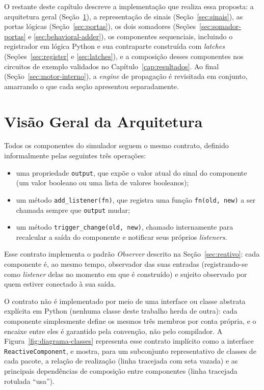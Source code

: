 O restante deste capítulo descreve a implementação que realiza essa proposta: a arquitetura geral (Seção~\ref{sec:visao-arquitetura}), a representação de sinais (Seção~\ref{sec:sinais}), as portas lógicas (Seção~\ref{sec:portas}), os dois somadores (Seções~\ref{sec:somador-portas} e \ref{sec:behavioral-adder}), os componentes sequenciais, incluindo o registrador em lógica Python e sua contraparte construída com \textit{latches} (Seções~\ref{sec:register} e \ref{sec:latches}), e a composição desses componentes nos circuitos de exemplo validados no Capítulo~\ref{cap:resultados}. Ao final (Seção~\ref{sec:motor-interno}), a \textit{engine} de propagação é revisitada em conjunto, amarrando o que cada seção apresentou separadamente.

\section{Visão Geral da Arquitetura}
\label{sec:visao-arquitetura}

Todos os componentes do simulador seguem o mesmo contrato, definido informalmente pelas seguintes três operações:

\begin{itemize}
    \item uma propriedade \texttt{output}, que expõe o valor atual do sinal do componente (um valor booleano ou uma lista de valores booleanos);
    \item um método \texttt{add\_listener(fn)}, que registra uma função \texttt{fn(old, new)} a ser chamada sempre que \texttt{output} mudar;
    \item um método \texttt{trigger\_change(old, new)}, chamado internamente para recalcular a saída do componente e notificar seus próprios \textit{listeners}.
\end{itemize}

Esse contrato implementa o padrão \textit{Observer} descrito na Seção~\ref{sec:reativo}: cada componente é, ao mesmo tempo, observador das suas entradas (registrando-se como \textit{listener} delas no momento em que é construído) e sujeito observado por quem estiver conectado à sua saída.

O contrato não é implementado por meio de uma interface ou classe abstrata explícita em Python (nenhuma classe deste trabalho herda de outra): cada componente simplesmente define os mesmos três membros por conta própria, e o encaixe entre eles é garantido pela convenção, não pelo compilador. A Figura~\ref{fig:diagrama-classes} representa esse contrato implícito como a interface \texttt{ReactiveComponent}, e mostra, para um subconjunto representativo de classes de cada pacote, a relação de realização (linha tracejada com seta vazada) e as principais dependências de composição entre componentes (linha tracejada rotulada ``usa'').

